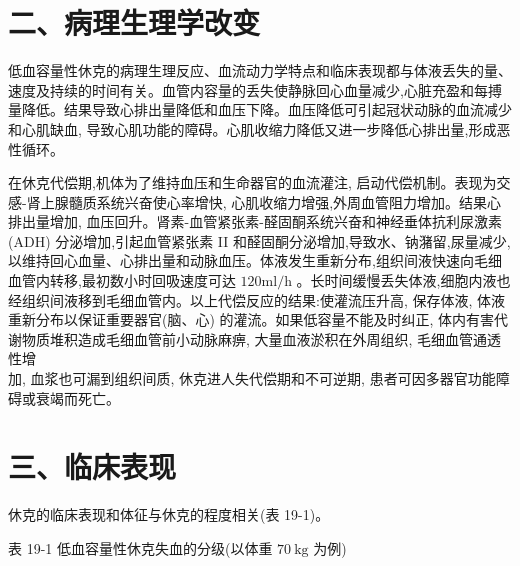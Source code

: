 \documentclass[10pt]{article}
\begin{document}
\section*{二、病理生理学改变}
低血容量性休克的病理生理反应、血流动力学特点和临床表现都与体液丢失的量、速度及持续的时间有关。血管内容量的丢失使静脉回心血量减少,心脏充盈和每搏量降低。结果导致心排出量降低和血压下降。血压降低可引起冠状动脉的血流减少和心肌缺血, 导致心肌功能的障碍。心肌收缩力降低又进一步降低心排出量,形成恶性循环。

在休克代偿期,机体为了维持血压和生命器官的血流灌注, 启动代偿机制。表现为交感-肾上腺髓质系统兴奋使心率增快, 心肌收缩力增强,外周血管阻力增加。结果心排出量增加, 血压回升。肾素-血管紧张素-醛固酮系统兴奋和神经垂体抗利尿激素(ADH) 分泌增加,引起血管紧张素 II 和醛固酮分泌增加,导致水、钠潴留,尿量减少,以维持回心血量、心排出量和动脉血压。体液发生重新分布,组织间液快速向毛细血管内转移,最初数小时回吸速度可达 $120 \mathrm{ml} / \mathrm{h}$ 。长时间缓慢丢失体液,细胞内液也经组织间液移到毛细血管内。以上代偿反应的结果:使灌流压升高, 保存体液, 体液重新分布以保证重要器官(脑、心) 的灌流。如果低容量不能及时纠正, 体内有害代谢物质堆积造成毛细血管前小动脉麻痹, 大量血液淤积在外周组织, 毛细血管通透性增\\
加, 血浆也可漏到组织间质, 休克进人失代偿期和不可逆期, 患者可因多器官功能障碍或衰竭而死亡。

\section*{三、临床表现}
休克的临床表现和体征与休克的程度相关(表 19-1)。

表 19-1 低血容量性休克失血的分级(以体重 $70 \mathrm{~kg}$ 为例)
\end{document}
